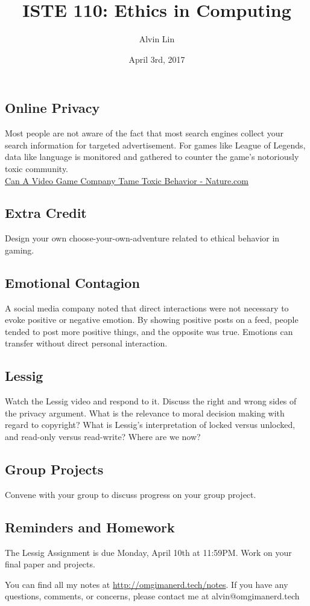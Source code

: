 \documentclass{article}
\title{ISTE 110: Ethics in Computing}
\author{Alvin Lin}
\date{April 3rd, 2017}
\begin{document}
\maketitle

\subsection*{Online Privacy}
Most people are not aware of the fact that most search engines collect your
search information for targeted advertisement. For games like League of
Legends, data like language is monitored and gathered to counter the game's
notoriously toxic community. \\
\href{http://www.nature.com/news/can-a-video-game-company-tame-toxic-behaviour-1.19647}{Can A Video Game Company Tame Toxic Behavior - Nature.com}

\subsection*{Extra Credit}
Design your own choose-your-own-adventure related to ethical behavior in
gaming.

\subsection*{Emotional Contagion}
A social media company noted that direct interactions were not necessary to
evoke positive or negative emotion. By showing positive posts on a feed,
people tended to post more positive things, and the opposite was true.
Emotions can transfer without direct personal interaction.

\subsection*{Lessig}
Watch the Lessig video and respond to it. Discuss the right and wrong sides
of the privacy argument. What is the relevance to moral decision making with
regard to copyright? What is Lessig's interpretation of locked versus unlocked,
and read-only versus read-write? Where are we now?

\subsection*{Group Projects}
Convene with your group to discuss progress on your group project.

\subsection*{Reminders and Homework}
The Lessig Assignment is due Monday, April 10th at 11:59PM.
Work on your final paper and projects.

\begin{center}
  You can find all my notes at \url{http://omgimanerd.tech/notes}. If you have
  any questions, comments, or concerns, please contact me at
  alvin@omgimanerd.tech
\end{center}
\end{document}
